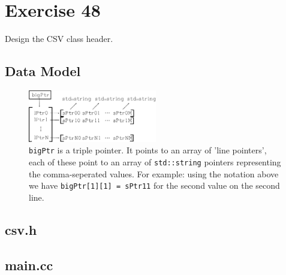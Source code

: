 \section{Exercise 48}
\begin{question}
Design the CSV class header.
\end{question}

\begin{solution}

    \subsection{Data Model}
    \begin{figure}[H]
        \centering
        \includegraphics[width=0.5\textwidth]{../48/images/datamodel.eps}
        \caption{\texttt{bigPtr} is a triple pointer. It points to an array of 'line pointers', each of these point to an array of \texttt{std::string} pointers representing the comma-seperated values. For example: using the notation above we have \texttt{bigPtr[1][1] = sPtr11} for the second value on the second line.}
    \end{figure}

    \subsection{csv.h}
    \subsection{main.cc}
\end{solution}
